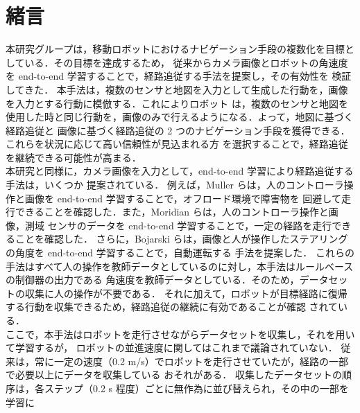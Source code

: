 \documentclass{jarticle}
\begin{document}
\date{} %

\maketitle
\thispagestyle{empty}
\pagestyle{empty}

\small
\section{緒言}
本研究グループは，移動ロボットにおけるナビゲーション手段の複数化を目標としている．その目標を達成するため，
従来からカメラ画像とロボットの角速度を end-to-end 学習することで，経路追従する手法を提案し，その有効性を
検証してきた\cite{okada}\cite{okada2}\cite{kiyooka}．
本手法は，複数のセンサと地図を入力として生成した行動を，画像を入力とする行動に模倣する．これによりロボット
は，複数のセンサと地図を使用した時と同じ行動を，画像のみで行えるようになる．よって，地図に基づく経路追従と
画像に基づく経路追従の 2 つのナビゲーション手段を獲得できる．これらを状況に応じて高い信頼性が見込まれる方
を選択することで，経路追従を継続できる可能性が高まる．\\
\hspace*{1zw}本研究と同様に，カメラ画像を入力として，end-to-end 学習により経路追従する手法は，いくつか
提案されている．
例えば，Muller らは，人のコントローラ操作と画像を end-to-end 学習することで，オフロード環境で障害物を
回避して走行できることを確認した\cite{off_load}．また，Moridian らは，人のコントローラ操作と画像，測域
センサのデータを end-to-end 学習することで，一定の経路を走行できることを確認した\cite{Moridian}．
さらに，Bojarski らは，画像と人が操作したステアリングの角度を end-to-end 学習することで，自動運転する
手法を提案した\cite{Bojarski}．
これらの手法はすべて人の操作を教師データとしているのに対し，本手法はルールベースの制御器の出力である
角速度を教師データとしている．そのため，データセットの収集に人の操作が不要である．
それに加えて，ロボットが目標経路に復帰する行動を収集できるため，経路追従の継続に有効であることが確認
されている\cite{imai}．\\
\hspace*{1zw}ここで，本手法はロボットを走行させながらデータセットを収集し，それを用いて学習するが，
ロボットの並進速度に関してはこれまで議論されていない．
従来は，常に一定の速度（0.2 m/s）でロボットを走行させていたが，経路の一部で必要以上にデータを収集している
おそれがある．
収集したデータセットの順序は，各ステップ（0.2 s 程度）ごとに無作為に並び替えられ，その中の一部を学習に
\end{document}
